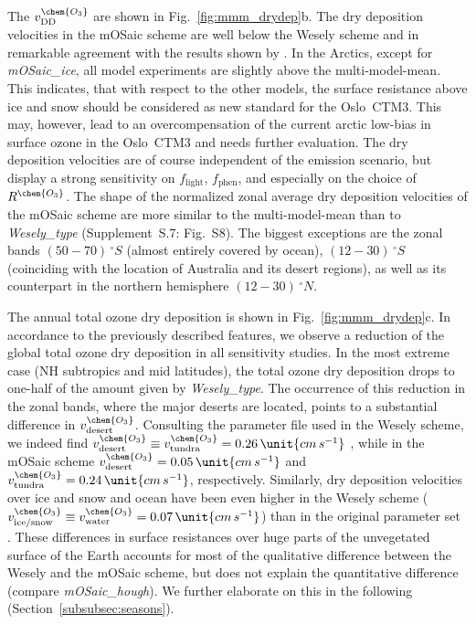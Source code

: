 \documentclass[gmd, manuscript]{copernicus}
\begin{document}
The $v^\chem{O_3}_\text{DD}$ are shown in Fig.~\ref{fig:mmm_drydep}b. The dry deposition velocities in the mOSaic scheme are well below the Wesely scheme and in remarkable agreement with the results shown by \citet{ACP:Hardacre2015}. In the Arctics, except for \emph{mOSaic\_ice}, all model experiments are slightly above the multi-model-mean. This indicates, that with respect to the other models, the \citet{ACP:Helmig2007} surface resistance above ice and snow should be considered as new standard for the Oslo~CTM3. This may, however, lead to an overcompensation of the current arctic low-bias in surface ozone in the Oslo~CTM3 and needs further evaluation. The dry deposition velocities are of course independent of the emission scenario, but display a strong sensitivity on $f_\text{light}$, $f_\text{phen}$, and especially on the choice of $R^\chem{O_3}$. The shape of the normalized zonal average dry deposition velocities of the mOSaic scheme are more similar to the multi-model-mean than to \emph{Wesely\_type} (Supplement~S.7: Fig.~S8). The biggest exceptions are the zonal bands $(50-70)\,\unit{^\circ S}$ (almost entirely covered by ocean), $(12-30)\,\unit{^\circ S}$ (coinciding with the location of Australia and its desert regions), as well as its counterpart in the northern hemisphere $(12-30)\,\unit{^\circ N}$.

The annual total ozone dry deposition is shown in Fig.~\ref{fig:mmm_drydep}c. In accordance to the previously described features, we observe a reduction of the global total ozone dry deposition in all sensitivity studies. In the most extreme case (NH subtropics and mid latitudes), the total ozone dry deposition drops to one-half of the amount given by \emph{Wesely\_type}. The occurrence of this reduction in the zonal bands, where the major deserts are located, points to a substantial difference in $v_\text{desert}^\chem{O_3}$. Consulting the parameter file used in the Wesely scheme, we indeed find $v_\text{desert}^\chem{O_3} \equiv v_\text{tundra}^\chem{O_3} = 0.26\,\unit{cm\,s^{-1}}$ \citep{JGR:Hough1991}, while in the mOSaic scheme $v_\text{desert}^\chem{O_3}=0.05\,\unit{cm\,s^{-1}}$ and $v^\chem{O_3}_\text{tundra} = 0.24\,\unit{cm\,s^{-1}}$, respectively. Similarly, dry deposition velocities over ice and snow and ocean have been even higher in the Wesely scheme ($v_\text{ice/snow}^\chem{O_3}\equiv v_\text{water}^\chem{O_3}=0.07\,\unit{cm\,s^{-1}}$) than in the original parameter set \citep[$v_\text{ice/snow}^\chem{O_3}\equiv v_\text{water}^\chem{O_3}=0.05\,\unit{cm\,s^{-1}}$,][]{ACP:Simpson2012}. These differences in surface resistances over huge parts of the unvegetated surface of the Earth accounts for most of the qualitative difference between the Wesely and the mOSaic scheme, but does not explain the quantitative difference (compare \emph{mOSaic\_hough}). We further elaborate on this in the following (Section~\ref{subsubsec:seasons}).
\end{document}
